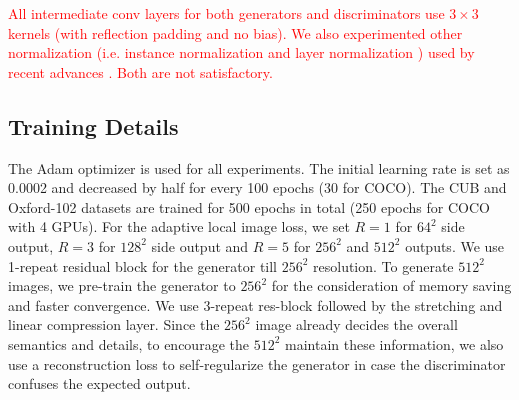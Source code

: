 \documentclass[10pt,twocolumn,letterpaper]{article}
\begin{document}
\textcolor{red}{All intermediate conv layers for both generators and discriminators use $3{\times}3$ kernels (with reflection padding and no bias).
We also experimented other normalization (i.e. instance normalization \cite{ulyanov2016instance} and layer normalization \cite{ba2016layer}) used by recent advances \cite{zhu2017unpaired,chen2017photographic}. Both are not satisfactory. }



\subsection{Training Details}
The Adam optimizer is used for all experiments.  The initial learning rate is set as 0.0002 and decreased by half for every 100 epochs (30 for COCO). The CUB and Oxford-102 datasets are trained for 500 epochs in total (250 epochs for COCO with 4 GPUs).
For the adaptive local image loss, we set $R=1$ for $64^2$ side output, $R=3$ for $128^2$ side output and $R=5$ for $256^2$ and $512^2$ outputs.
We use 1-repeat residual block for the generator till $256^2$ resolution.
To generate $512^2$ images, we pre-train the generator to $256^2$ for the consideration of memory saving and faster convergence. We use $3$-repeat res-block followed by the stretching and linear compression layer. Since the $256^2$ image already decides the overall semantics and details, to encourage the $512^2$ maintain these information, we also use a reconstruction loss to self-regularize the generator in case the discriminator confuses the expected output.



\end{document}
